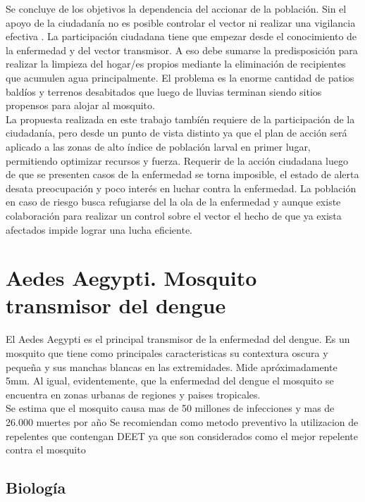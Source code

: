 Se concluye de los objetivos la dependencia del accionar de la población. Sin el apoyo de la ciudadanía no es posible controlar el vector ni realizar una vigilancia efectiva . La participación ciudadana tiene que empezar desde el conocimiento de la enfermedad y del vector transmisor. A eso debe sumarse la predisposición para realizar la limpieza del hogar/es propios mediante la eliminación de recipientes que acumulen agua principalmente. El problema es la enorme cantidad de patios baldíos y terrenos desabitados que luego de lluvias terminan siendo sitios propensos para alojar al mosquito.\\


La propuesta realizada en este trabajo tambíén requiere de la participación de la ciudadanía, pero desde un punto de vista distinto ya que el plan de acción será aplicado a las zonas de alto índice de población larval en primer lugar, permitiendo optimizar recursos y fuerza. Requerir de la acción ciudadana luego de que se presenten casos de la enfermedad se torna imposible, el estado de alerta desata preocupación y poco interés en luchar contra la enfermedad. La población en caso de riesgo busca refugiarse del la ola de la enfermedad y aunque existe colaboración para realizar un control sobre el vector el hecho de que ya exista afectados impide lograr una lucha eficiente.

\section{Aedes Aegypti. Mosquito transmisor del dengue}
El Aedes Aegypti  es el principal transmisor de la enfermedad del dengue. Es un mosquito que tiene como principales caracteristicas su contextura oscura y pequeña y sus manchas blancas en las extremidades. Mide apróximadamente 5mm. Al igual, evidentemente, que la enfermedad del dengue el mosquito se encuentra en zonas urbanas de regiones y paises tropicales.\\

Se estima que el mosquito causa mas de 50 millones de infecciones y mas de 26.000 muertes por año
Se recomiendan como metodo preventivo la utilizacion de repelentes que contengan DEET ya que son considerados como el mejor repelente contra el mosquito\\

\subsection{Biología}

